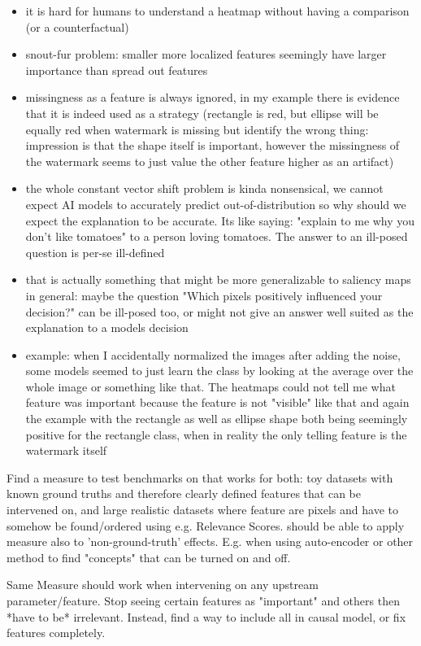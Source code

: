{\begin{itemize}
    \item it is hard for humans to understand a heatmap without having a comparison (or a counterfactual)
    \item snout-fur problem: smaller more localized features seemingly have larger importance than spread out features
    \item missingness as a feature is always ignored, in my example there is evidence that it is indeed used as a strategy (rectangle is red, but ellipse will be equally red when watermark is missing but identify the wrong thing: impression is that the shape itself is important, however the missingness of the watermark seems to just value the other feature higher as an artifact)
    \item the whole constant vector shift problem is kinda nonsensical, we cannot expect AI models to accurately predict out-of-distribution so why should we expect the explanation to be accurate. Its like saying: "explain to me why you don't like tomatoes" to a person loving tomatoes. The answer to an ill-posed question is per-se ill-defined
    \item that is actually something that might be more generalizable to saliency maps in general: maybe the question "Which pixels positively influenced your decision?" can be ill-posed too, or might not give an answer well suited as the explanation to a models decision
    \item example: when I accidentally normalized the images after adding the noise, some models seemed to just learn the class by looking at the average over the whole image or something like that. The heatmaps could not tell me what feature was important because the feature is not "visible" like that
    and again the example with the rectangle as well as ellipse shape both being seemingly positive for the rectangle class, when in reality the only telling feature is the watermark itself
\end{itemize}

Find a measure to test benchmarks on that works for both: toy datasets with known ground truths and therefore clearly defined features that can be intervened on, and large realistic datasets where feature are pixels and have to somehow be found/ordered using e.g. Relevance Scores.
should be able to apply measure also to 'non-ground-truth' effects. E.g. when using auto-encoder or other method to find "concepts" that can be turned on and off. 

Same Measure should work when intervening on any upstream parameter/feature. Stop seeing certain features as "important" and others then *have to be* irrelevant. Instead, find a way to include all in causal model, or fix features completely.

}
